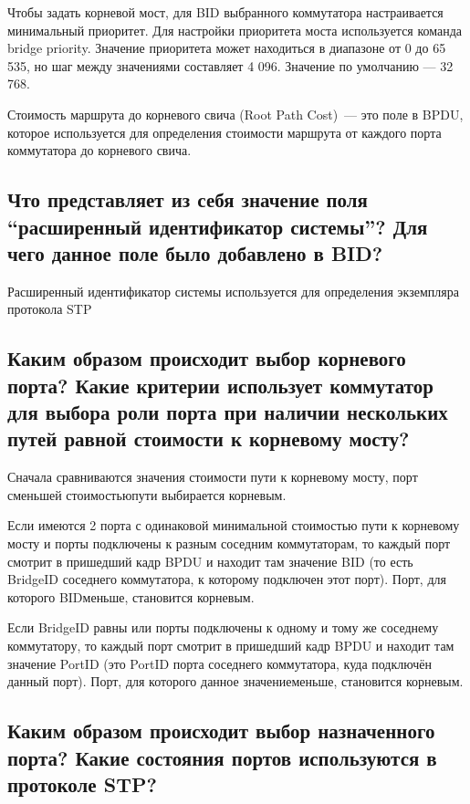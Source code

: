 Чтобы задать корневой мост, для BID выбранного коммутатора настраивается
минимальный приоритет. Для настройки приоритета моста используется
команда bridge priority. Значение приоритета может находиться в диапазоне
от 0 до 65 535, но шаг между значениями составляет 4 096.
Значение по умолчанию — 32 768.\par
Стоимость маршрута до корневого свича (Root Path Cost) --- это поле в BPDU,
которое используется для определения стоимости маршрута
от каждого порта коммутатора до корневого свича.

\subsection{Что представляет из себя значение поля “расширенный идентификатор 
системы”? Для чего данное поле было добавлено в BID?}

Расширенный идентификатор системы используется для определения 
экземпляра протокола STP
 
\subsection{Каким образом происходит выбор корневого порта? Какие критерии 
использует коммутатор для выбора роли порта при наличии 
нескольких путей равной стоимости к корневому мосту?}

Сначала сравниваются значения стоимости пути к корневому мосту, 
порт сменьшей стоимостьюпути выбирается корневым.\par
Если имеются 2 порта с одинаковой минимальной стоимостью пути 
к корневому мосту и порты подключены к разным соседним 
коммутаторам, то каждый порт смотрит в пришедший кадр BPDU и 
находит там значение BID (то есть BridgeID соседнего коммутатора, к 
которому подключен этот порт). Порт, для которого BIDменьше, 
становится корневым.\par
Если BridgeID равны или порты подключены к одному и тому же 
соседнему коммутатору, то каждый порт смотрит в пришедший кадр 
BPDU и находит там значение PortID (это PortID порта соседнего 
коммутатора, куда подключён данный порт). Порт, для которого 
данное значениеменьше, становится корневым.

\subsection{Каким образом происходит выбор назначенного порта? Какие 
состояния портов используются в протоколе STP?}

